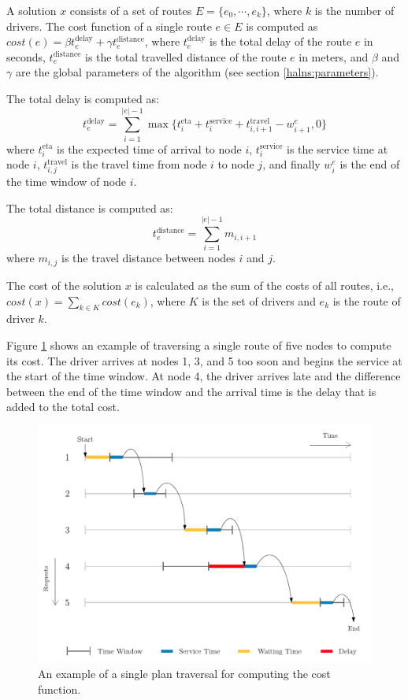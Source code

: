     A solution $x$ consists of a set of routes $E = \{e_0,\cdots,e_k\}$, where $k$ is the number of drivers. The cost function of a single route $e \in E$ is computed as $cost(e) = \beta t^{\mathrm{delay}}_e + \gamma t^{\mathrm{distance}}_e$, where $t^{\mathrm{delay}}_e$ is the total delay of the route $e$ in seconds, $t^{\mathrm{distance}}_e$ is the total travelled distance of the route $e$ in meters, and $\beta$ and $\gamma$ are the global parameters of the algorithm (see section \ref{halns:parameters}).
    
    The total delay is computed as:
    \[ t^{\mathrm{delay}}_e = \sum_{i = 1}^{|e|-1} \max\{t^{\mathrm{eta}}_i + t^{\mathrm{service}}_i + t^{\mathrm{travel}}_{i,i+1} - w^e_{i+1}, 0\} \]
    where $t^{\mathrm{eta}}_i$ is the expected time of arrival to node $i$, $t^{\mathrm{service}}_i$ is the service time at node $i$, $t^{\mathrm{travel}}_{i,j}$ is the travel time from node $i$ to node $j$, and finally $w^e_i$ is the end of the time window of node $i$.
    
    The total distance is computed as:
    \[ t^{\mathrm{distance}}_e = \sum_{i = 1}^{|e|-1} m_{i, i+1}\]
    where $m_{i, j}$ is the travel distance between nodes $i$ and $j$.
    
    The cost of the solution $x$ is calculated as the sum of the costs of all routes, i.e., $cost(x) = \sum_{k \in K} cost(e_k)$, where $K$ is the set of drivers and $e_k$ is the route of driver $k$.

    Figure \ref{fig:plan-traversal} shows an example of traversing a single route of five nodes to compute its cost. The driver arrives at nodes 1, 3, and 5 too soon and begins the service at the start of the time window. At node 4, the driver arrives late and the difference between the end of the time window and the arrival time is the delay that is added to the total cost.
    
    \begin{figure}[ht]
        \centering
        \includegraphics[width=1\textwidth]{figures/plan-traversal.pdf}
        \caption{An example of a single plan traversal for computing the cost function.}
        \label{fig:plan-traversal}
    \end{figure}
    
